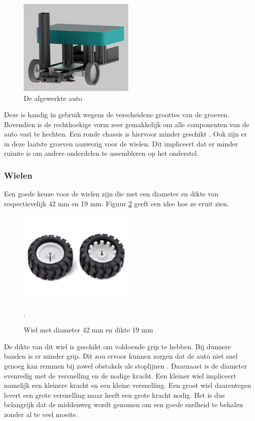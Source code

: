 \documentclass[a4paper,twoside,kulak]{kulakreport} %
\begin{document}
\begin{figure}
	\includegraphics[width=0.5\textwidth]{4Volledig}
	\centering
	\caption{De afgewerkte auto}
	\label{opbouw4}
\end{figure}

Deze is handig in gebruik wegens de verscheidene groottes van de groeven. %
Bovendien is de rechthoekige vorm zeer gemakkelijk om alle componenten van de auto vast te hechten. Een ronde chassis is hiervoor minder geschikt \cite{RobotChassis}. Ook zijn er in deze laatste groeven aanwezig voor de wielen. Dit impliceert dat er minder ruimte is om andere onderdelen te assembleren op het onderstel. %
\label{Chassis}

\subsubsection{Wielen}
Een goede keuze voor de wielen zijn die met een diameter en dikte van respectievelijk 42 mm en 19 mm.
Figuur \ref{fig:wiel} geeft een idee hoe ze eruit zien.

\begin{figure}
	\includegraphics[width=0.5\textwidth]{wielen}
	\centering
	\caption{Wiel met diameter 42 mm en dikte 19 mm} 
	\cite{Wiel42x19mm}.
	\label{fig:wiel}
\end{figure}

De dikte van dit wiel is geschikt om voldoende grip te hebben. Bij dunnere banden is er minder grip. Dit zou ervoor kunnen zorgen dat de auto niet snel genoeg kan remmen bij zowel obstakels als stoplijnen \cite{Banden}. 
Daarnaast is de diameter evenredig met de versnelling en de nodige kracht. Een kleiner wiel impliceert namelijk een kleinere kracht en een kleine versnelling. Een groot wiel daarentegen levert een grote versnelling maar heeft een grote kracht nodig. Het is dus belangrijk dat de middenweg wordt genomen om een goede snelheid te behalen zonder al te veel moeite.  
\end{document}
